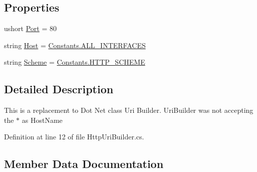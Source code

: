 \subsection*{Properties}
\begin{DoxyCompactItemize}
\item 
ushort \mbox{\hyperlink{class_concord_1_1_c3_http_module_1_1_http_uri_builder_adc628b6895d402e3f805cabafce8cb11}{Port}} = 80
\item 
string \mbox{\hyperlink{class_concord_1_1_c3_http_module_1_1_http_uri_builder_aea098c21d58cb7c0f34dba606cee80fd}{Host}} = \mbox{\hyperlink{class_concord_1_1_c3_http_module_1_1_constants_a3fe72e8bc32c96064538c8af8199c478}{Constants.\+A\+L\+L\+\_\+\+I\+N\+T\+E\+R\+F\+A\+C\+ES}}
\item 
string \mbox{\hyperlink{class_concord_1_1_c3_http_module_1_1_http_uri_builder_aec68ef1c873d7894850552ee9067119a}{Scheme}} = \mbox{\hyperlink{class_concord_1_1_c3_http_module_1_1_constants_ad5d0cf769b25bef58e712036c67b915b}{Constants.\+H\+T\+T\+P\+\_\+\+S\+C\+H\+E\+ME}}
\end{DoxyCompactItemize}


\subsection{Detailed Description}
This is a replacement to Dot Net class Uri Builder. Uri\+Builder was not accepting the $\ast$ as Host\+Name 



Definition at line 12 of file Http\+Uri\+Builder.\+cs.



\subsection{Member Data Documentation}
\mbox{\label{class_concord_1_1_c3_http_module_1_1_http_uri_builder_a6415279869c6a83068a99084b334c32c}} 
